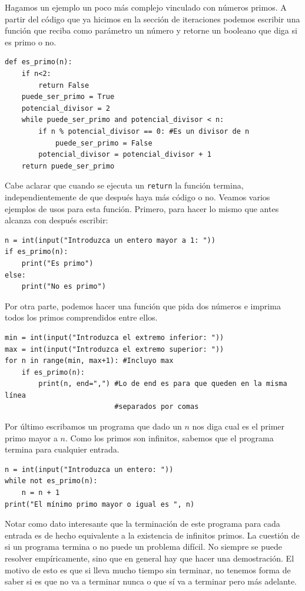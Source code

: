 \documentclass[a4paper, 12pt]{report}
\theoremstyle{definition}
\begin{document}
Hagamos un ejemplo un poco más complejo vinculado con números primos. A partir del código que ya hicimos en la sección de iteraciones podemos escribir una función que reciba como parámetro un número y retorne un booleano que diga si es primo o no.
\begin{verbatim}
def es_primo(n):
    if n<2:
        return False
    puede_ser_primo = True
    potencial_divisor = 2
    while puede_ser_primo and potencial_divisor < n:
        if n % potencial_divisor == 0: #Es un divisor de n
            puede_ser_primo = False
        potencial_divisor = potencial_divisor + 1
    return puede_ser_primo
\end{verbatim}
Cabe aclarar que cuando se ejecuta un {\tt return} la función termina, independientemente de que después haya más código o no. Veamos varios ejemplos de usos para esta función. Primero, para hacer lo mismo que antes alcanza con después escribir:
\begin{verbatim}
n = int(input("Introduzca un entero mayor a 1: "))
if es_primo(n):
    print("Es primo")
else:
    print("No es primo")
\end{verbatim}
Por otra parte, podemos hacer una función que pida dos números e imprima todos los primos comprendidos entre ellos.
\begin{verbatim}
min = int(input("Introduzca el extremo inferior: "))
max = int(input("Introduzca el extremo superior: "))
for n in range(min, max+1): #Incluyo max
    if es_primo(n):
        print(n, end=",") #Lo de end es para que queden en la misma línea
                          #separados por comas
\end{verbatim}
Por último escribamos un programa que dado un $n$ nos diga cual es el primer primo mayor a $n$. Como los primos son infinitos, sabemos que el programa termina para cualquier entrada.
\begin{verbatim}
n = int(input("Introduzca un entero: "))
while not es_primo(n):
    n = n + 1
print("El mínimo primo mayor o igual es ", n)
\end{verbatim}
Notar como dato interesante que la terminación de este programa para cada entrada es de hecho equivalente a la existencia de infinitos primos. La cuestión de si un programa termina o no puede un problema difícil. No siempre se puede resolver empíricamente, sino que en general hay que hacer una demostración. El motivo de esto es que si lleva mucho tiempo sin terminar, no tenemos forma de saber si es que no va a terminar nunca o que sí va a terminar pero más adelante.
\end{document}
